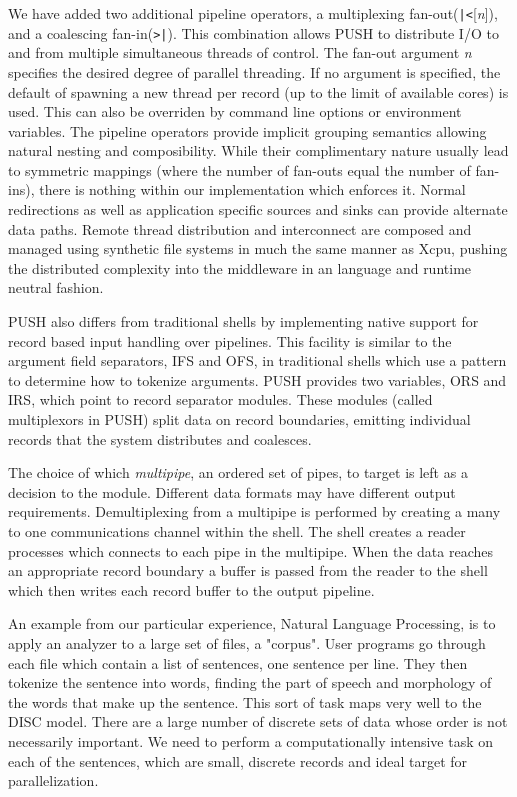 We have added two additional pipeline operators, 
a multiplexing fan-out(\verb!|<![\emph{n}]), and a coalescing fan-in(\verb!>|!). 
This combination allows PUSH to distribute I/O to and from multiple
simultaneous threads of control.
The fan-out argument \emph{n} specifies the desired degree of parallel 
threading.  If no argument is specified, the default of spawning a new
thread per record (up to the limit of available cores) is used.  This can
also be overriden by command line options or environment variables.
The pipeline operators provide implicit grouping semantics allowing natural 
nesting and composibility.
While their complimentary nature usually lead to symmetric
mappings (where the number of fan-outs equal the number of fan-ins), there is 
nothing within our implementation which enforces it.
Normal redirections as well as application specific sources and sinks 
can provide alternate data paths.
Remote thread distribution and interconnect are composed and managed
using synthetic file systems in much the same manner as Xcpu,\cite{xcpu}
pushing the distributed complexity into the middleware in an language and 
runtime neutral fashion.

PUSH also differs from traditional shells by implementing native support for 
record based input handling over pipelines. This facility is similar to the 
argument field separators, IFS and OFS, in traditional shells which use a 
pattern to determine how to tokenize arguments. PUSH provides two variables,  
ORS and IRS, which point to record separator modules. These modules 
(called multiplexors in PUSH) split data on record boundaries, emitting 
individual records that the system distributes and coalesces. 

The choice of which \emph{multipipe}, an ordered set of pipes, to target is left as a decision to the module. 
Different data formats may have different output requirements. 
Demultiplexing from a multipipe is performed by creating a many to one 
communications channel within the shell. The shell creates a reader processes 
which connects to each pipe in the multipipe. When the data reaches an 
appropriate record boundary a buffer is passed from the reader to the shell 
which then writes each record buffer to the output pipeline. 

An example from our particular experience, Natural Language Processing, is 
to apply an analyzer to a large set of files, a "corpus". User programs go 
through each file which contain a list of sentences, one sentence per line. 
They then tokenize the sentence into words, finding the part of speech and 
morphology of the words that make up the sentence.
This sort of task maps very well to the DISC model. There are a large number of 
discrete sets of data whose order is not necessarily important. We need to 
perform a computationally intensive task on each of the sentences, which are 
small, discrete records and ideal target for parallelization. 

